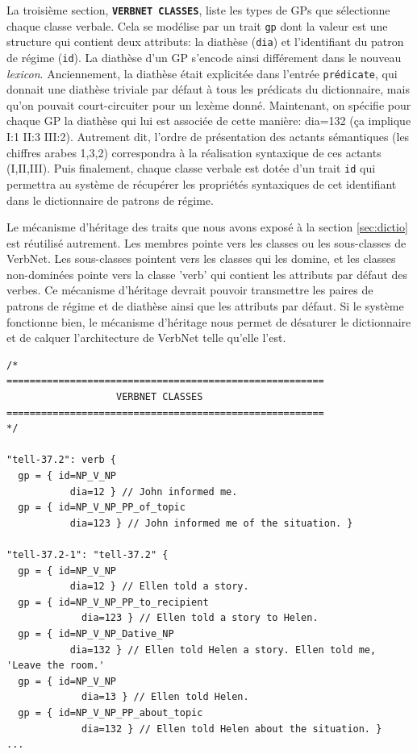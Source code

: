 La troisième section, \textbf{\texttt{VERBNET CLASSES}}, liste les types de \acp{GP} que sélectionne chaque classe verbale. Cela se modélise par un trait \texttt{gp} dont la valeur est une structure qui contient deux attributs: la diathèse (\texttt{dia}) et l'identifiant du patron de régime (\texttt{id}). La diathèse d'un \ac{GP} s'encode ainsi différement dans le nouveau \emph{lexicon}. Anciennement, la diathèse était explicitée dans l'entrée \texttt{prédicate}, qui donnait une diathèse triviale par défaut à tous les prédicats du dictionnaire, mais qu'on pouvait court-circuiter pour un lexème donné. Maintenant, on spécifie pour chaque \ac{GP} la diathèse qui lui est associée de cette manière: dia=132 (ça implique I:1 II:3 III:2). Autrement dit, l'ordre de présentation des actants sémantiques (les chiffres arabes 1,3,2) correspondra à la réalisation syntaxique de ces actants (I,II,III). Puis finalement, chaque classe verbale est dotée d'un trait \texttt{id} qui permettra au système de récupérer les propriétés syntaxiques de cet identifiant dans le dictionnaire de patrons de régime.

Le mécanisme d'héritage des traits que nous avons exposé à la section \ref{sec:dictio} est réutilisé autrement. Les membres pointe vers les classes ou les sous-classes de VerbNet. Les sous-classes pointent vers les classes qui les domine, et les classes non-dominées pointe vers la classe 'verb' qui contient les attributs par défaut des verbes. Ce mécanisme d'héritage devrait pouvoir transmettre les paires de patrons de régime et de diathèse ainsi que les attributs par défaut. Si le système fonctionne bien, le mécanisme d'héritage nous permet de désaturer le dictionnaire et de calquer l'architecture de VerbNet telle qu'elle l'est.

\begin{lstlisting}[language=mate, caption = Extrait du \emph{lexicon}: classes de VerbNet]
/*
=======================================================
                   VERBNET CLASSES
=======================================================
*/

"tell-37.2": verb {
  gp = { id=NP_V_NP  
	       dia=12 } // John informed me.
  gp = { id=NP_V_NP_PP_of_topic  
	       dia=123 } // John informed me of the situation. }

"tell-37.2-1": "tell-37.2" {
  gp = { id=NP_V_NP  
	       dia=12 } // Ellen told a story.
  gp = { id=NP_V_NP_PP_to_recipient 
		     dia=123 } // Ellen told a story to Helen.
  gp = { id=NP_V_NP_Dative_NP   
	       dia=132 } // Ellen told Helen a story. Ellen told me, 'Leave the room.'
  gp = { id=NP_V_NP
		     dia=13 } // Ellen told Helen.
  gp = { id=NP_V_NP_PP_about_topic
		     dia=132 } // Ellen told Helen about the situation. }
...
\end{lstlisting}

